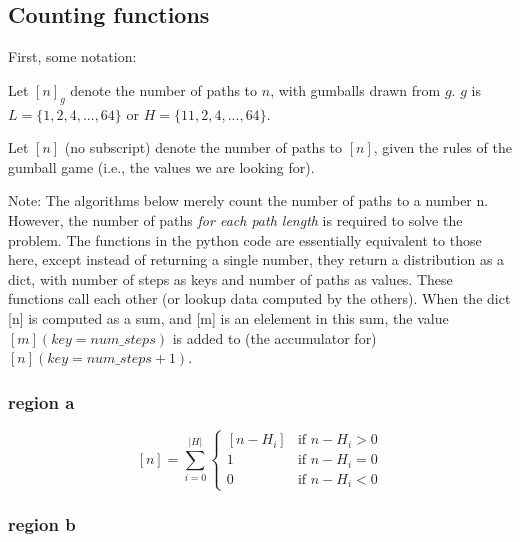 \documentclass[a4paper, 11pt]{article}
\begin{document}
\subsection{Counting functions}

First, some notation:

\medskip

\begin{adjustwidth}{3.0em}{3.0em}
Let $[n]_g$ denote the number of paths to $n$, with gumballs drawn from $g$. $g$ is $L = \{1, 2, 4, . . . , 64\}$ or $H = \{11, 2, 4, . . . , 64\}$.

\end{adjustwidth}

\medskip

\begin{adjustwidth}{3.0em}{3.0em}
Let $[n]$ (no subscript) denote the number of paths to $[n]$, given the rules of the gumball game (i.e., the values we are looking for).

\end{adjustwidth}

\medskip

Note: The algorithms below merely count the number of paths to a number n. However, the number of paths \textit{for each path length} is required to solve the problem. The functions in the python code are essentially equivalent to those here, except instead of returning a single number, they return a distribution as a dict, with number of steps as keys and number of paths as values. These functions call each other (or lookup data computed by the others). When the dict [n] is computed as a sum, and [m] is an elelement in this sum, the value $[m](key=num\_steps)$ is added to (the accumulator for) $[n](key=num\_steps + 1)$.\\ 

\subsubsection{region a}


\[
	[n] = \sum_{i=0}^{\vert H \vert}
		\begin{cases}
			[n - H_i]	& \text{if $n - H_i > 0$} \\
			1		& \text{if $n - H_i = 0$} \\
			0		& \text{if $n - H_i < 0$}
		 \end{cases}
\]

\subsubsection{region b}
\end{document}
